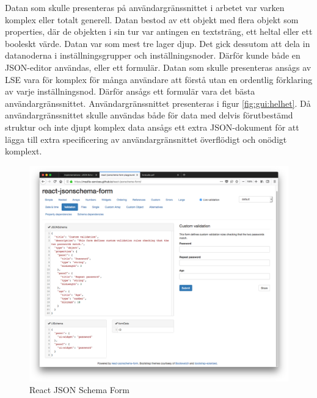 Datan som skulle presenteras på användargränssnittet i arbetet var varken komplex eller totalt generell. Datan bestod av ett objekt med flera objekt som properties, där de objekten i sin tur var antingen en textsträng, ett heltal eller ett booleskt värde. Datan var som mest tre lager djup. Det gick dessutom att dela in datanoderna i inställningsgrupper och inställningsnoder. Därför kunde både en JSON-editor användas, eller ett formulär. Datan som skulle presenteras ansågs av LSE vara för komplex för många användare att förstå utan en ordentlig förklaring av varje inställningsnod. Därför ansågs ett formulär vara det bästa användargränssnittet. Användargränssnittet presenteras i figur \ref{fig:gui:helhet}. Då användargränssnittet skulle användas både för data med delvis förutbestämd struktur och inte djupt komplex data ansågs ett extra JSON-dokument för att lägga till extra specificering av användargränsnittet överflödigt och onödigt komplext.

\begin{figure}
	\includegraphics[width=\textwidth]{./images/screenshot-react-jsonschema-form.png}
	\vspace{-1.7em}
	\caption{React JSON Schema Form \cite{MozillaServices}}
	\label{fig:react-jsonschema-form}
\end{figure}

